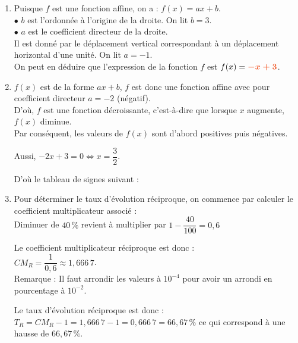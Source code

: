 \documentclass[a4paper,11pt]{article}
\begin{document}
\begin{seance}{} %
\begin{enumerate}
\item  Puisque $f$ est une fonction affine, on a : $f(x)=ax+b$.\\$\bullet$ $b$ est l'ordonnée à l'origine de la droite. On lit $b=3$.\\$\bullet$ $a$ est le coefficient directeur de la droite.\\
          Il est donné par le déplacement vertical correspondant à un déplacement horizontal d'une unité. On lit $a=-1$.\\ On peut en déduire que l'expression de la fonction $f$ est $f(x)={\color[HTML]{f15929}\boldsymbol{-x+3}}$.

\item $f(x)$ est de la forme $ax+b$, $f$ est donc une fonction affine avec pour coefficient directeur  $a=-2$  (négatif).\\
             D'où, $f$ est une fonction  décroissante, c'est-à-dire que lorsque $x$ augmente, $f(x)$  diminue. \\
             Par conséquent, les valeurs de $f(x)$ sont d'abord positives puis négatives.

\medskip

             Aussi, $-2x+3=0 \iff x=\dfrac{3}{2}$.

\medskip
 D'où le tableau de signes suivant :\\

\item  Pour déterminer le taux d'évolution réciproque, on commence par calculer le coefficient multiplicateur associé :\\Diminuer de $40\,\%$ revient à multiplier par $ 1 - \dfrac{40}{100} = 0{,}6$ 

\medskip
Le coefficient multiplicateur réciproque est donc : \\$CM_R=\dfrac{1}{0{,}6} \approx 1{,}666\,7$.{\color[HTML]{f15929}\\Remarque : Il faut arrondir les valeurs à $10^{-4}$ pour avoir un arrondi en pourcentage à $10^{-2}$.}

\medskip
 Le taux d'évolution réciproque est donc : \\$T_R=CM_R-1=1{,}666\,7-1=0{,}666\,7=66{,}67\,\%$ ce qui correspond à une hausse de $66{,}67\,\%$.


\end{enumerate}
\end{seance}
\end{document}
